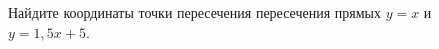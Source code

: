 \begin{ex}
	\begin{condition}
		Найдите координаты точки пересечения пересечения прямых \( y=x \) и \( y=1,5x+5 \).
	\end{condition}
\end{ex}